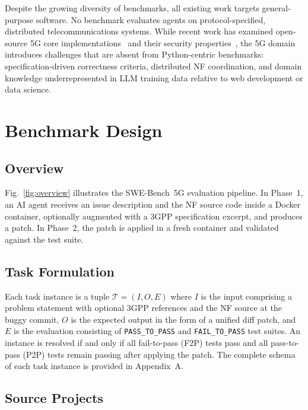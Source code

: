 \documentclass[10pt,conference]{IEEEtran}
\begin{document}
Despite the growing diversity of benchmarks, all existing work targets general-purpose software. No benchmark evaluates agents on protocol-specified, distributed telecommunications systems. While recent work has examined open-source 5G core implementations~\cite{kousias2023open5g} and their security properties~\cite{giambartolomei2024penetration}, the 5G domain introduces challenges that are absent from Python-centric benchmarks: specification-driven correctness criteria, distributed NF coordination, and domain knowledge underrepresented in LLM training data relative to web development or data science.

\section{Benchmark Design}

\subsection{Overview}

Fig.~\ref{fig:overview} illustrates the SWE-Bench~5G evaluation pipeline. In Phase~1, an AI agent receives an issue description and the NF source code inside a Docker container, optionally augmented with a 3GPP specification excerpt, and produces a patch. In Phase~2, the patch is applied in a fresh container and validated against the test suite.


\subsection{Task Formulation}

Each task instance is a tuple $\mathcal{T} = (I, O, E)$ where $I$ is the input comprising a problem statement with optional 3GPP references and the NF source at the buggy commit, $O$ is the expected output in the form of a unified diff patch, and $E$ is the evaluation consisting of \texttt{PASS\_TO\_PASS} and \texttt{FAIL\_TO\_PASS} test suites. An instance is resolved if and only if all fail-to-pass (F2P) tests pass and all pass-to-pass (P2P) tests remain passing after applying the patch. The complete schema of each task instance is provided in Appendix~A.

\subsection{Source Projects}
\end{document}
